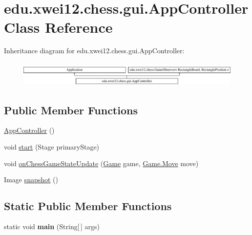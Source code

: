 \hypertarget{classedu_1_1xwei12_1_1chess_1_1gui_1_1_app_controller}{}\section{edu.\+xwei12.\+chess.\+gui.\+App\+Controller Class Reference}
\label{classedu_1_1xwei12_1_1chess_1_1gui_1_1_app_controller}
Inheritance diagram for edu.\+xwei12.\+chess.\+gui.\+App\+Controller\+:\begin{figure}[H]
\begin{center}
\leavevmode
\includegraphics[height=1.290323cm]{classedu_1_1xwei12_1_1chess_1_1gui_1_1_app_controller}
\end{center}
\end{figure}
\subsection*{Public Member Functions}
\begin{DoxyCompactItemize}
\item 
\hyperlink{classedu_1_1xwei12_1_1chess_1_1gui_1_1_app_controller_abceb1198f2298df21da0add550da15e9}{App\+Controller} ()
\item 
void \hyperlink{classedu_1_1xwei12_1_1chess_1_1gui_1_1_app_controller_ac4e307711931ef3465cb0c096c68e301}{start} (Stage primary\+Stage)
\item 
void \hyperlink{classedu_1_1xwei12_1_1chess_1_1gui_1_1_app_controller_a8195eeec526afaa9e3b7e3a3f1cd84b8}{on\+Chess\+Game\+State\+Update} (\hyperlink{classedu_1_1xwei12_1_1chess_1_1_game}{Game} game, \hyperlink{classedu_1_1xwei12_1_1chess_1_1_game_1_1_move}{Game.\+Move} move)
\item 
Image \hyperlink{classedu_1_1xwei12_1_1chess_1_1gui_1_1_app_controller_ab9418c923ea97a7e04d0d148b198be82}{snapshot} ()
\end{DoxyCompactItemize}
\subsection*{Static Public Member Functions}
\begin{DoxyCompactItemize}
\item 
static void {\bfseries main} (String\mbox{[}$\,$\mbox{]} args)\hypertarget{classedu_1_1xwei12_1_1chess_1_1gui_1_1_app_controller_a7d2c18ab0a7334e57bcf937bd5618e76}{}\label{classedu_1_1xwei12_1_1chess_1_1gui_1_1_app_controller_a7d2c18ab0a7334e57bcf937bd5618e76}

\end{DoxyCompactItemize}


